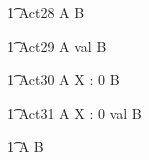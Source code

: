 \begin{circusaction}
    	\t1 Act28 \circdef A \circtimedinterrupt {}  \rcirctime B \\
\end{circusaction}

\begin{circusaction}
    	\t1 Act29 \circdef A \circtimedinterrupt {} \upto val \rcirctime B \\
\end{circusaction}

\begin{circusaction}
    	\t1 Act30 \circdef A \circtimedinterrupt \lcirctime X : 0  \rcirctime B \\
\end{circusaction}

\begin{circusaction}
    	\t1 Act31 \circdef A \circtimedinterrupt \lcirctime X : 0 \upto val \rcirctime B \\
\end{circusaction}

\begin{circusaction}
        \t1 \circspot A \circseq B\\
\end{circusaction}

\begin{circus}
    \circend
\end{circus}


